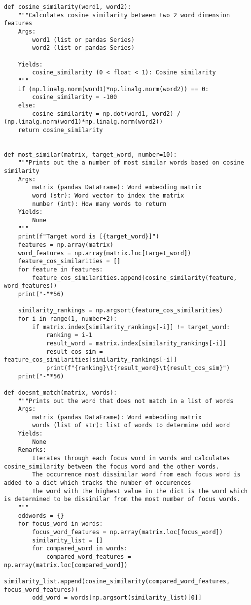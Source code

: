 \documentclass[12pt, letterpaper]{article}
\begin{document}
\begin{mdframed}[backgroundcolor=shadecolor]
\begin{verbatim}
def cosine_similarity(word1, word2):
    """Calculates cosine similarity between two 2 word dimension features
    Args:
        word1 (list or pandas Series)
        word2 (list or pandas Series)

    Yields:
        cosine_similarity (0 < float < 1): Cosine similarity
    """
    if (np.linalg.norm(word1)*np.linalg.norm(word2)) == 0:
        cosine_similarity = -100
    else:
        cosine_similarity = np.dot(word1, word2) / (np.linalg.norm(word1)*np.linalg.norm(word2))
    return cosine_similarity


def most_similar(matrix, target_word, number=10):
    """Prints out the a number of most similar words based on cosine similarity
    Args:
        matrix (pandas DataFrame): Word embedding matrix
        word (str): Word vector to index the matrix
        number (int): How many words to return
    Yields:
        None 
    """
    print(f"Target word is [{target_word}]")
    features = np.array(matrix)
    word_features = np.array(matrix.loc[target_word])
    feature_cos_similarities = []
    for feature in features:
        feature_cos_similarities.append(cosine_similarity(feature, word_features))
    print("-"*56)
    
    similarity_rankings = np.argsort(feature_cos_similarities)
    for i in range(1, number+2):
        if matrix.index[similarity_rankings[-i]] != target_word:
            ranking = i-1
            result_word = matrix.index[similarity_rankings[-i]]
            result_cos_sim = feature_cos_similarities[similarity_rankings[-i]]
            print(f"{ranking}\t{result_word}\t{result_cos_sim}")
    print("-"*56)
    
def doesnt_match(matrix, words):
    """Prints out the word that does not match in a list of words
    Args:
        matrix (pandas DataFrame): Word embedding matrix
        words (list of str): list of words to determine odd word
    Yields:
        None
    Remarks:
        Iterates through each focus word in words and calculates cosine_similarity between the focus word and the other words.
        The occurrence most dissimilar word from each focus word is added to a dict which tracks the number of occurences
        The word with the highest value in the dict is the word which is determined to be dissimilar from the most number of focus words.
    """
    oddwords = {}
    for focus_word in words:
        focus_word_features = np.array(matrix.loc[focus_word])
        similarity_list = []
        for compared_word in words:
            compared_word_features = np.array(matrix.loc[compared_word])
            similarity_list.append(cosine_similarity(compared_word_features, focus_word_features))
        odd_word = words[np.argsort(similarity_list)[0]]


\end{verbatim}
\end{mdframed}
\end{document}
